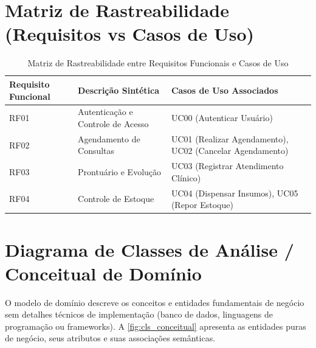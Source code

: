 \section{Matriz de Rastreabilidade (Requisitos vs Casos de Uso)}
\begin{table}[htbp]
\caption{Matriz de Rastreabilidade entre Requisitos Funcionais e Casos de Uso}
\label{tab:rastreabilidade_rf_uc}
\centering
\small
\begin{tabularx}{\textwidth}{@{} l Y l @{}}
\toprule
\textbf{Requisito Funcional} & \textbf{Descrição Sintética} & \textbf{Casos de Uso Associados} \\
\midrule
RF01 & Autenticação e Controle de Acesso & UC00 (Autenticar Usuário) \\
RF02 & Agendamento de Consultas & UC01 (Realizar Agendamento), UC02 (Cancelar Agendamento) \\
RF03 & Prontuário e Evolução & UC03 (Registrar Atendimento Clínico) \\
RF04 & Controle de Estoque & UC04 (Dispensar Insumos), UC05 (Repor Estoque) \\
\bottomrule
\end{tabularx}
\end{table}

\section{Diagrama de Classes de Análise / Conceitual de Domínio}
O modelo de domínio descreve os conceitos e entidades fundamentais de negócio sem detalhes técnicos de implementação (banco de dados, linguagens de programação ou frameworks). A \autoref{fig:cls_conceitual} apresenta as entidades puras de negócio, seus atributos e suas associações semânticas.

